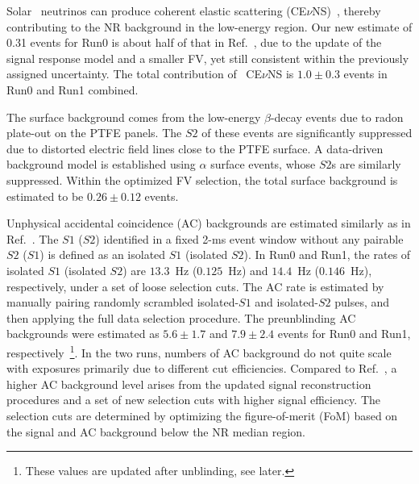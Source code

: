 \documentclass[%
 reprint,
superscriptaddress,
 amsmath,amssymb,
 aps,
 prl,
]{revtex4-1}
\begin{document}
Solar \, neutrinos can produce coherent elastic scattering (CE$\nu$NS)~\cite{Ruppin2014_NeutrinoBg}, thereby contributing to the NR background in the low-energy region.
Our new estimate of 0.31 events for Run0 is about half of that in Ref.~\cite{Meng2021_P4First}, due to the update of the signal response model and a smaller FV, yet still consistent within the previously assigned uncertainty.
The total contribution of \, CE$\nu$NS is $1.0 \pm 0.3$ events in Run0 and Run1 combined.

The surface background comes from the low-energy $\beta$-decay events due to radon plate-out on the PTFE panels. The $S2$ of these events are significantly suppressed due to distorted electric field lines close to the PTFE surface. A data-driven background model is established using  $\alpha$ surface events, whose $S2$s are similarly suppressed. Within the optimized FV selection, the total surface background is estimated to be $0.26 \pm 0.12$ events.

Unphysical accidental coincidence (AC) backgrounds are estimated similarly as in Ref.~\cite{Abdukerim2022_AC}.
The $S1$ ($S2$) identified in a fixed 2-ms event window without any pairable $S2$ ($S1$) is defined as an isolated $S1$ (isolated $S2$).
In Run0 and Run1, the rates of isolated $S1$ (isolated $S2$) are $13.3$~Hz ($0.125$~Hz) and $14.4$~Hz ($0.146$~Hz), respectively, under a set of loose selection cuts.
The AC rate is estimated by manually pairing randomly scrambled isolated-$S1$ and isolated-$S2$ pulses, and then applying the full data selection procedure. 
The preunblinding AC backgrounds were estimated as $5.6 \pm 1.7$ and $7.9 \pm 2.4$ events for Run0 and Run1, respectively~\footnote{These values are updated after unblinding, see later.}.
In the two runs, numbers of AC background do not quite scale with exposures primarily due to different cut efficiencies.
Compared to Ref.~\cite{Meng2021_P4First}, a higher AC background level arises from the updated signal reconstruction procedures and a set of new selection cuts with higher signal efficiency.
The selection cuts are determined by optimizing the figure-of-merit (FoM) based on the signal and AC background below the NR median region.
\end{document}
